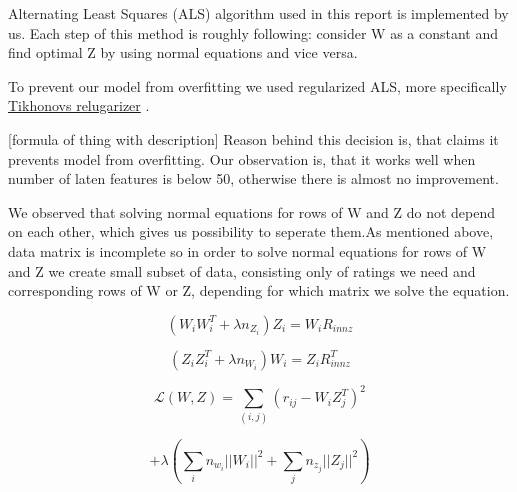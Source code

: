 Alternating Least Squares (ALS) algorithm used in this report is implemented by us. Each step of this method is roughly following: consider W as a constant and find optimal Z by using normal equations and vice versa. 

To prevent our model from overfitting we used regularized ALS, more specifically 
\href{https://en.wikipedia.org/wiki/Tikhonov_regularization}{Tikhonovs relugarizer}
. 

[formula of thing with description]
Reason behind this decision is, that 
\cite{Zhou2008}
 claims it prevents model from overfitting. Our observation is, that it works well when number of laten features is below 50, otherwise there is almost no improvement. 

We observed that solving normal equations for rows of W and Z do not depend on each other, which gives us possibility to seperate them.As mentioned above, data matrix is incomplete so in order to solve normal equations for rows of W and Z we create small subset of data, consisting only of ratings we need and corresponding rows of W or Z, depending for which matrix we solve the equation. 

$$(W_iW_i^T + \lambda n_{Z_i})Z_i=W_iR_{innz} $$

$$(Z_iZ_i^T + \lambda n_{W_i})W_i=Z_iR^T_{innz}$$

$$ \mathcal{L}(W,Z)=\sum_{(i,j)}(r_{ij}-W_iZ_j^T)^2$$

$$+\lambda(\sum_i n_{w_i}||W_i||^2+\sum_j n_{z_j}||Z_j||^2)$$


